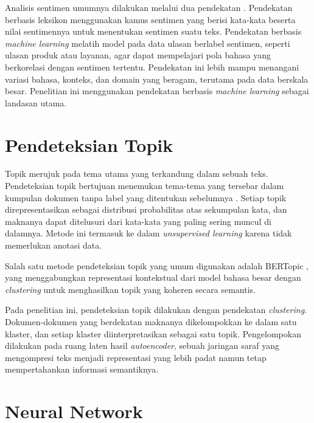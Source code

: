 Analisis sentimen umumnya dilakukan melalui dua pendekatan
\parencite{pang2002thumbs}. Pendekatan berbasis leksikon menggunakan
kamus sentimen yang berisi kata-kata beserta nilai sentimennya untuk
menentukan sentimen suatu teks. Pendekatan berbasis \textit{machine
learning} melatih model pada data ulasan berlabel sentimen, seperti
ulasan produk atau layanan, agar dapat mempelajari pola bahasa yang
berkorelasi dengan sentimen tertentu. Pendekatan ini lebih
mampu menangani variasi bahasa, konteks, dan domain yang beragam,
terutama pada data berskala besar. Penelitian ini menggunakan pendekatan
berbasis \textit{machine learning} sebagai landasan utama.

\section{Pendeteksian Topik}

Topik merujuk pada tema utama yang terkandung dalam sebuah teks.
Pendeteksian topik bertujuan menemukan tema-tema yang tersebar dalam
kumpulan dokumen tanpa label yang ditentukan sebelumnya
\parencite{blei2012probabilistic}. Setiap topik direpresentasikan
sebagai distribusi probabilitas atas sekumpulan kata, dan maknanya
dapat ditelusuri dari kata-kata yang paling sering muncul di dalamnya.
Metode ini termasuk ke dalam \textit{unsupervised learning} karena
tidak memerlukan anotasi data.

Salah satu metode pendeteksian topik yang umum digunakan adalah BERTopic
\parencite{grootendorst2022bertopic}, yang menggabungkan representasi
kontekstual dari model bahasa besar dengan \textit{clustering} untuk
menghasilkan topik yang koheren secara semantis.

Pada penelitian ini, pendeteksian topik dilakukan dengan pendekatan
\textit{clustering}. Dokumen-dokumen yang berdekatan maknanya
dikelompokkan ke dalam satu klaster, dan setiap klaster
diinterpretasikan sebagai satu topik. Pengelompokan dilakukan pada
ruang laten hasil \textit{autoencoder}, sebuah jaringan saraf yang
mengompresi teks menjadi representasi yang lebih padat namun tetap
mempertahankan informasi semantiknya.

\section{Neural Network}

